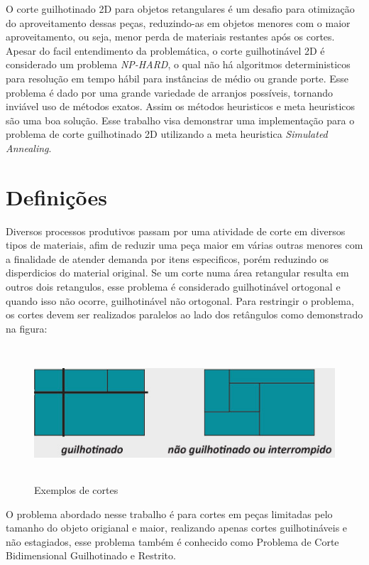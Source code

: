 \documentclass[12pt]{article}
\begin{document}
O corte guilhotinado 2D para objetos retangulares é um desafio para otimização do aproveitamento dessas peças, reduzindo-as em objetos menores com o maior aproveitamento, ou seja, menor perda de materiais restantes após os cortes. 
Apesar do facil entendimento da problemática, o corte guilhotinável 2D é considerado um problema \textit{NP-HARD}, o qual não há algoritmos deterministicos para resolução em tempo hábil para instâncias de médio ou grande porte.
Esse problema é dado por uma grande variedade de arranjos possíveis, tornando inviável uso de métodos exatos. Assim os métodos heuristicos e meta heuristicos são uma boa solução.
Esse trabalho visa demonstrar uma implementação para o problema de corte guilhotinado 2D utilizando a meta heuristica \textit{Simulated Annealing}. 

\section*{Definições}
	
	Diversos processos produtivos passam por uma atividade de corte em diversos tipos de materiais, afim de reduzir uma peça maior em várias outras menores com a finalidade de atender demanda por itens especificos, porém reduzindo os disperdicios do material original. 
	Se um corte numa área retangular resulta em outros dois retangulos, esse problema é considerado guilhotinável ortogonal e quando isso não ocorre, guilhotinável não ortogonal. Para restringir o problema, os cortes devem ser realizados paralelos ao lado dos retângulos como demonstrado na figura:
	
	\begin{figure}[h]
    \centering
    \includegraphics[width=15cm, height=5cm]{imagens/guilhotine}
    \caption{Exemplos de cortes}
  \end{figure}
	
	O problema abordado nesse trabalho é para cortes em peças limitadas pelo tamanho do objeto origianal e maior, realizando apenas cortes guilhotináveis e não estagiados, esse problema também é conhecido como  Problema de Corte Bidimensional Guilhotinado e Restrito.
	
\end{document}
